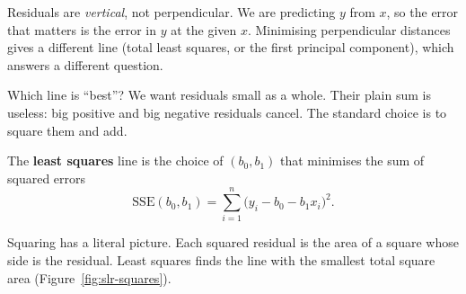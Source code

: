 \begin{trapbox}
Residuals are \emph{vertical}, not perpendicular. We are predicting $y$ from
$x$, so the error that matters is the error in $y$ at the given $x$. Minimising
perpendicular distances gives a different line (total least squares, or the
first principal component), which answers a different question.
\end{trapbox}

Which line is ``best''? We want residuals small as a whole. Their plain sum is
useless: big positive and big negative residuals cancel. The standard choice is
to square them and add.

\begin{definition}
The \textbf{least squares} line is the choice of $(b_0,b_1)$ that minimises the
sum of squared errors
\[
  \mathrm{SSE}(b_0,b_1) = \sum_{i=1}^n \bigl(y_i - b_0 - b_1 x_i\bigr)^2 .
\]
\end{definition}

Squaring has a literal picture. Each squared residual is the area of a square
whose side is the residual. Least squares finds the line with the smallest total
square area (Figure~\ref{fig:slr-squares}).

